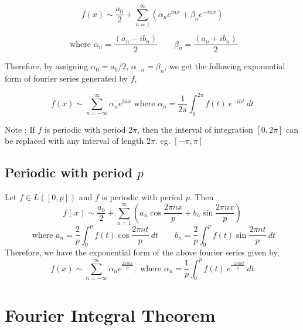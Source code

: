 	\[ f(x) \sim \frac{a_0}{2} + \sum_{n=1}^\infty \left( \alpha_n e^{inx} + \beta_n e^{-inx} \right) \]

	\[ \text{ where } \alpha_n = \frac{(a_n - ib_n)}{2} \qquad \beta_n = \frac{(a_n+ib_n)}{2} \]

	Therefore, by assigning \(\alpha_0 = a_0/2\), \(\alpha_{-n} = \beta_n\), we get the following exponential form of fourier series generated by $f$,

	\[ f(x) \sim \sum_{n = -\infty}^\infty \alpha_n e^{inx} \text{ where } \alpha_n = \frac{1}{2\pi} \int_0^{2\pi} f(t)\ e^{-int}\ dt \]

	Note : If $f$ is periodic with period $2\pi$, then the interval of integration $[0,2\pi]$ can be replaced with any interval of length $2\pi$. eg. $[-\pi,\pi]$

\subsection{Periodic with period $p$}
	Let \(f \in L([0,p])\) and $f$ is periodic with period $p$. Then
	\[ f(x) \sim \frac{a_0}{2} + \sum_{n=1}^\infty \left( a_n \cos \frac{2\pi nx}{p} + b_n \sin \frac{2\pi nx}{p} \right) \]
	\[ \text{ where } a_n = \frac{2}{p} \int_0^p f(t) \cos \frac{2\pi nt}{p}\ dt \qquad b_n = \frac{2}{p} \int_0^p f(t) \sin \frac{2\pi nt}{p}\ dt \]
	Therefore, we have the exponential form of the above fourier series given by,
	\[ f(x) \sim \sum_{n = -\infty}^\infty \alpha_n e^\frac{2\pi inx}{p},\text{ where } \alpha_n = \frac{1}{p} \int_0^p f(t)\ e^\frac{-2\pi int}{p}\ dt \]
	
\section{Fourier Integral Theorem}

